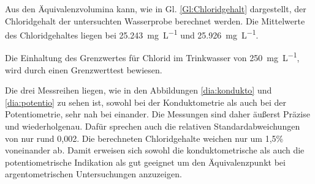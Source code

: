 Aus den Äquivalenzvolumina kann, wie in Gl. \eqref{Gl:Chloridgehalt} dargestellt, der Chloridgehalt der untersuchten Wasserprobe berechnet werden. Die Mittelwerte des Chloridgehaltes liegen bei \SI{25,243}{\milli\gram\per\liter} und \SI{25,926}{\milli\gram\per\liter}. 




Die Einhaltung des Grenzwertes für Chlorid im Trinkwasser von \SI{250}{\milli\gram\per\liter}, wird durch einen Grenzwerttest bewiesen. 








Die drei Messreihen liegen, wie in den Abbildungen \ref{dia:kondukto} und \ref{dia:potentio} zu sehen ist, sowohl bei der Konduktometrie als auch bei der Potentiometrie, sehr nah bei einander. Die Messungen sind daher äußerst Präzise und wiederholgenau. Dafür sprechen auch die relativen Standardabweichungen von nur rund 0,002. Die berechneten Chloridgehalte weichen nur um 1,5\% voneinander ab. 
Damit erweisen sich sowohl die konduktometrische als auch die potentiometrische Indikation als gut geeignet um den Äquivalenzpunkt bei argentometrischen Untersuchungen anzuzeigen.

